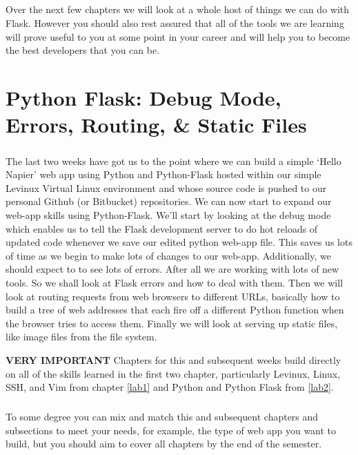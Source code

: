 \documentclass[12pt, a4paper, twoside]{book}
\begin{document}
\paragraph{} Over the next few chapters we will look at a whole host of things we can do with Flask. However you should also rest assured that all of the tools we are learning will prove useful to you at some point in your career and will help you to become the best developers that you can be.



\chapter{Python Flask: Debug Mode, Errors, Routing, \& Static Files}
\label{lab3}
\paragraph{} The last two weeks have got us to the point where we can build a simple `Hello Napier' web app using Python and Python-Flask hosted within our simple Levinux Virtual Linux environment and whose source code is pushed to our personal Github (or Bitbucket) repositories. We can now start to expand our web-app skills using Python-Flask. We'll start by looking at the debug mode which enables us to tell the Flask development server to do hot reloads of updated code whenever we save our edited python web-app file. This saves us lots of time as we begin to make lots of changes to our web-app. Additionally, we should expect to to see lots of errors. After all we are working with lots of new tools. So we shall look at Flask errors and how to deal with them. Then we will look at routing requests from web browsers to different URLs, basically how to build a tree of web addresses that each fire off a different Python function when the browser tries to access them. Finally we will look at serving up static files, like image files from the file system.

\begin{framed}
\textbf{VERY IMPORTANT} Chapters for this and subsequent weeks build directly on all of the skills learned in the first two chapter, particularly Levinux, Linux, SSH, and Vim from chapter \ref{lab1} and Python and Python Flask from \ref{lab2}.

\paragraph{} To some degree you can mix and match this and subsequent chapters and subsections to meet your needs, for example, the type of web app you want to build, but you should aim to cover all chapters by the end of the semester.
\end{framed}
\end{document}
